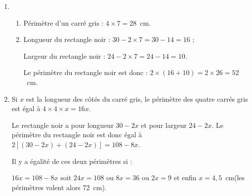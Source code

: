 
\medskip

% 
%
 
\begin{enumerate}
\item %
	\begin{enumerate}
		\item %
		Périmètre d'un carré gris : $4 \times 7 = 28$~cm. 
		\item %
Longueur du rectangle noir : $30 - 2\times 7 = 30 - 14 = 16$ ;

Largeur du rectangle noir : $24 - 2\times 7 = 24 - 14 = 10$.

Le périmètre du rectangle noir est donc : $2 \times (16 + 10) = 2 \times 26 = 52$~cm.
	\end{enumerate}
\item %
 
Si $x$ est la longueur des côtés du carré gris, le périmètre des quatre carrés gris est égal à $4 \times 4 \times x = 16x$.

Le rectangle noir a pour longueur $30 - 2x$ et pour largeur $24 - 2x$. Le périmètre du rectangle noir est donc égal à $2[(30 - 2x) + (24 - 2x)] = 108 - 8x$.

Il y a égalité de ces deux périmètres si :

$16x = 108 - 8x$  soit $24x = 108$ ou $8x = 36$ ou $2x = 9$ et enfin $x = 4,5$~cm(les périmètres valent alors 72~cm).
\end{enumerate} 

\vspace{0,5cm} 

